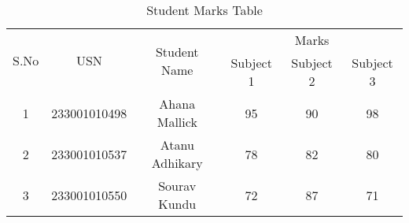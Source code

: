 \documentclass{article}
\begin{document}
\begin{table}[h!]
\centering
\begin{tabular}{|c|c|c|c|c|c|}
\hline
\multirow{2}{*}{S.No} & \multirow{2}{*}{USN} & \multirow{2}{*}{Student Name} & \multicolumn{3}{c|}{Marks} \\ \cline{4-6} 
                      &                      &                               & Subject 1 & Subject 2 & Subject 3 \\ \hline
1                     & 233001010498                & Ahana Mallick                      & 95        & 90        & 98        \\ \hline
2                     & 233001010537               & Atanu Adhikary                    & 78        & 82        & 80        \\ \hline
3                     & 233001010550              & Sourav Kundu                 & 72        & 87        & 71        \\ \hline
\end{tabular}
\caption{Student Marks Table}
\label{tab:student_marks}
\end{table}
\end{document}
